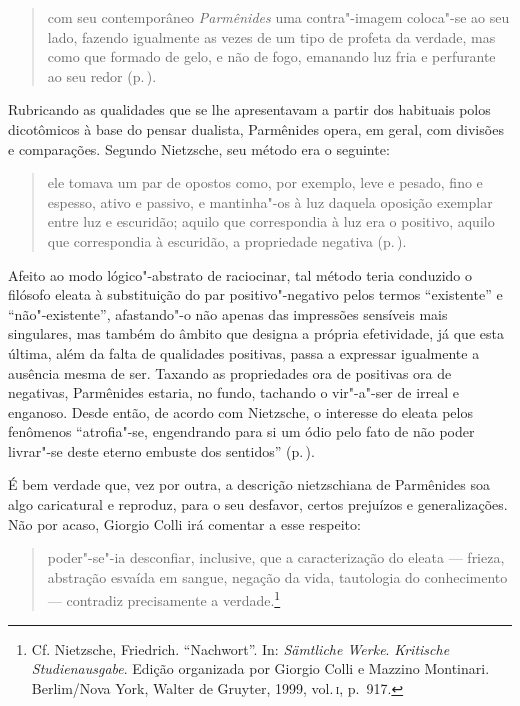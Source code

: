 \begin{quote} 
com seu contemporâneo \textit{Parmênides} uma
 contra"-imagem coloca"-se ao seu lado, fazendo igualmente as vezes de um
 tipo de profeta da verdade, mas como que formado de gelo, e não de fogo,
 emanando luz fria e perfurante ao seu redor (p.\,\pageref{comseucontemporaneo}).
\end{quote} 

Rubricando as qualidades que se lhe apresentavam a partir dos habituais polos
dicotômicos à base do pensar dualista, Parmênides opera, em geral, com
divisões e comparações. Segundo Nietzsche, seu método era o seguinte: 

\begin{quote} 
ele tomava um par de opostos como, por exemplo, leve e
 pesado, fino e espesso, ativo e passivo, e mantinha"-os à luz daquela
 oposição exemplar entre luz e escuridão; aquilo que correspondia à luz era o
 positivo, aquilo que correspondia à escuridão, a propriedade negativa
 (p.\,\pageref{eletomavaumpar}).
\end{quote} 

Afeito ao modo lógico"-abstrato de raciocinar, tal método teria conduzido o
filósofo eleata à substituição do par positivo"-negativo pelos termos
``existente'' e ``não"-existente'', afastando"-o não apenas das impressões
sensíveis mais singulares, mas também do âmbito que designa a própria
efetividade, já que esta última, além da falta de qualidades positivas, passa
a expressar igualmente a ausência mesma de ser. Taxando as propriedades ora
de positivas ora de negativas, Parmênides estaria, no fundo, tachando o
vir"-a"-ser de irreal e enganoso. Desde então, de acordo com Nietzsche, o
interesse do eleata pelos fenômenos ``atrofia"-se, engendrando para si um
ódio pelo fato de não poder livrar"-se deste eterno embuste dos sentidos''
(p.\,\pageref{odio}).

É bem verdade que, vez por outra, a descrição nietzschiana de Parmênides soa
algo caricatural e reproduz, para o seu desfavor, certos prejuízos e
generalizações. Não por acaso, Giorgio Colli irá comentar a esse respeito: 

\begin{quote} 
poder"-se"-ia desconfiar, inclusive, que a caracterização
 do	\label{colli} eleata --- frieza, abstração esvaída em sangue, negação da
 vida, tautologia do conhecimento --- contradiz precisamente a
 verdade.\footnote{ Cf. Nietzsche, Friedrich. ``Nachwort''. In:
\textit{Sämtliche Werke}. \textit{\mbox{Kritische} Studienausgabe}. Edição
 organizada por Giorgio Colli e Mazzino Montinari. Berlim/Nova York, Walter
 de Gruyter, 1999, vol.\,\textsc{i}, p.~917.} 
\end{quote} 

